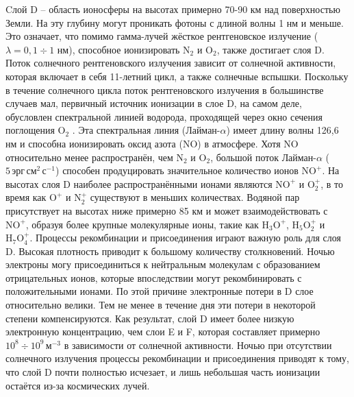 Cлой D -- область ионосферы на высотах примерно 70-90 км над поверхностью Земли.
На эту глубину могут проникать фотоны с длиной волны 1 нм и меньше. 
Это означает, что помимо гамма-лучей жёсткое рентгеновское излучение ($\lambda=0,1\div 1$ нм), способное ионизировать $\text{N}_2$ и $\text{O}_2$, также достигает слоя D.
Поток солнечного рентгеновского излучения зависит от солнечной активности, которая включает в себя 11-летний цикл, а также солнечные вспышки.
Поскольку в течение солнечного цикла поток рентгеновского излучения в большинстве случаев мал, первичный источник ионизации в слое D, на самом деле, обусловлен спектральной линией водорода, проходящей через окно сечения поглощения $\text{O}_2$ \cite{Rishbeth2003}.
Эта спектральная линия (Лайман-$\alpha$) имеет длину волны 126,6 нм и способна ионизировать оксид азота (NO) в атмосфере. 
Хотя NO относительно менее распространён, чем $\text{N}_2$ и $\text{O}_2$, большой поток Лайман-$\alpha$ ($5\,\text{эрг}\,\text{см}^2\,\text{с}^{-1}$) способен продуцировать значительное количество ионов $\text{NO}^{+}$.
На высотах слоя D наиболее распространёнными ионами являются $\text{NO}^{+}$ и $\text{O}_2^{+}$, в то время как $\text{O}^{+}$ и $\text{N}_2^{+}$ существуют в меньших количествах.
Водяной пар присутствует на высотах ниже примерно 85 км и может взаимодействовать с $\text{NO}^{+}$, образуя более крупные молекулярные ионы, такие как $\text{H}_3\text{O}^{+}$, $\text{H}_5\text{O}_2^{+}$ и $\text{H}_7\text{O}_4^{+}$. 
Процессы рекомбинации и присоединения играют важную роль для слоя D.
Высокая плотность приводит к большому количеству столкновений.
Ночью электроны могу присоединиться к нейтральным молекулам с образованием отрицательных ионов, которые впоследствии могут рекомбинировать с положительными ионами.
По этой причине электронные потери в D слое относительно велики.
Тем не менее в течение дня эти потери в некоторой степени компенсируются.
Как результат, слой D имеет более низкую электронную концентрацию, чем слои E и F, которая составляет примерно $10^8\div10^9\,\text{м}^{-3}$ в зависимости от солнечной активности. 
Ночью при отсутствии солнечного излучения процессы рекомбинации и присоединения приводят к тому, что слой D почти полностью исчезает, и лишь небольшая часть ионизации остаётся из-за космических лучей.

